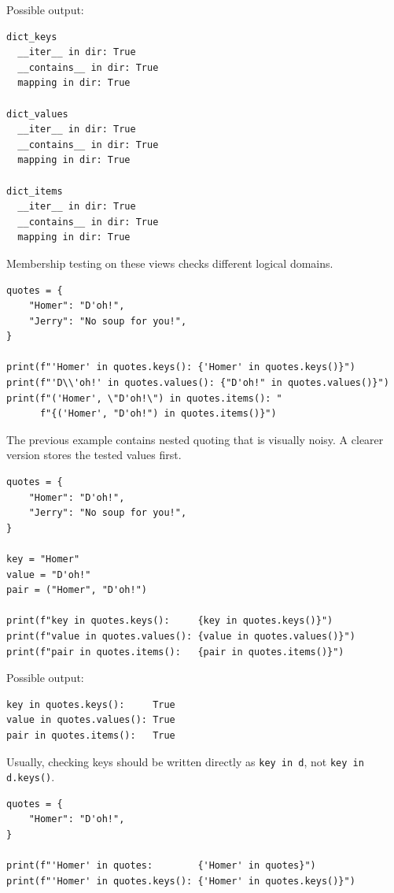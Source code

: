 Possible output:

\begin{verbatim}
dict_keys
  __iter__ in dir: True
  __contains__ in dir: True
  mapping in dir: True

dict_values
  __iter__ in dir: True
  __contains__ in dir: True
  mapping in dir: True

dict_items
  __iter__ in dir: True
  __contains__ in dir: True
  mapping in dir: True
\end{verbatim}

Membership testing on these views checks different logical domains.

\begin{verbatim}
quotes = {
    "Homer": "D'oh!",
    "Jerry": "No soup for you!",
}

print(f"'Homer' in quotes.keys(): {'Homer' in quotes.keys()}")
print(f"'D\\'oh!' in quotes.values(): {"D'oh!" in quotes.values()}")
print(f"('Homer', \"D'oh!\") in quotes.items(): "
      f"{('Homer', "D'oh!") in quotes.items()}")
\end{verbatim}

The previous example contains nested quoting that is visually noisy. A clearer version stores the tested values first.

\begin{verbatim}
quotes = {
    "Homer": "D'oh!",
    "Jerry": "No soup for you!",
}

key = "Homer"
value = "D'oh!"
pair = ("Homer", "D'oh!")

print(f"key in quotes.keys():     {key in quotes.keys()}")
print(f"value in quotes.values(): {value in quotes.values()}")
print(f"pair in quotes.items():   {pair in quotes.items()}")
\end{verbatim}

Possible output:

\begin{verbatim}
key in quotes.keys():     True
value in quotes.values(): True
pair in quotes.items():   True
\end{verbatim}

Usually, checking keys should be written directly as \texttt{key in d}, not \texttt{key in d.keys()}.

\begin{verbatim}
quotes = {
    "Homer": "D'oh!",
}

print(f"'Homer' in quotes:        {'Homer' in quotes}")
print(f"'Homer' in quotes.keys(): {'Homer' in quotes.keys()}")
\end{verbatim}

